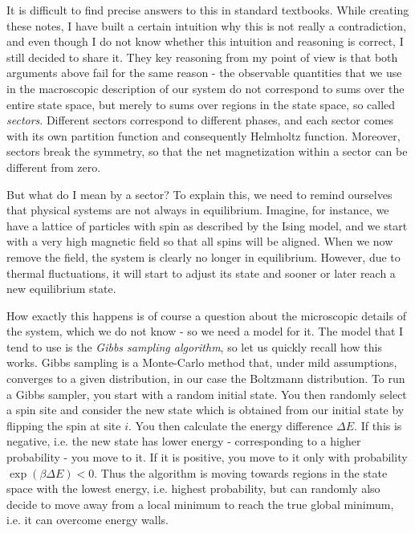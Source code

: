 \documentclass[a4paper, draft]{article}
\theoremstyle{own}
\theoremstyle{remark}
\begin{document}
It is difficult to find precise answers to this in standard textbooks. While creating these notes, I have built a certain intuition why this is not really a contradiction, and even though I do not know whether this intuition and reasoning is correct, I still decided to share it. They key reasoning from my point of view is that both arguments above fail for the same reason - the observable quantities that we use in the macroscopic description of our system do not correspond to sums over the entire state space, but merely to sums over regions in the state space, so called {\em sectors}. Different sectors correspond to different phases, and each sector comes with its own partition function and consequently Helmholtz function. Moreover, sectors break the symmetry, so that the net magnetization within a sector can be different from zero.

But what do I mean by a sector? To explain this, we need to remind ourselves that physical systems are not always in equilibrium. Imagine, for instance, we have a lattice of particles with spin as described by the Ising model, and we start with a very high magnetic field so that all spins will be aligned. When we now remove the field, the system is clearly no longer in equilibrium. However, due to thermal fluctuations, it will start to adjust its state and sooner or later reach a new equilibrium state. 

How exactly this happens is of course a question about the microscopic details of the system, which we do not know - so we need a model for it. The model that I tend to use is the {\em Gibbs sampling algorithm}, so let us quickly recall how this works. Gibbs sampling is a Monte-Carlo method that, under mild assumptions, converges to a given distribution, in our case the Boltzmann distribution. To run a Gibbs sampler, you start with a random initial state. You then randomly select a spin site and consider the new state which is obtained from our initial state by flipping the spin at site $i$. You then calculate the energy difference $\Delta E$. If this is negative, i.e. the new state has lower energy - corresponding to a higher probability - you move to it. If it is positive, you move to it only with probability $\exp(\beta \Delta E) < 0$. Thus the algorithm is moving towards regions in the state space with the lowest energy, i.e. highest probability, but can randomly also decide to move away from a local minimum to reach the true global minimum, i.e. it can overcome energy walls. 
\end{document}
